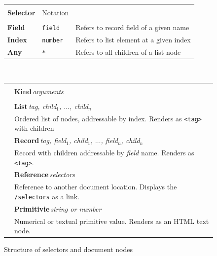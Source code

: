 \documentclass[sigconf]{acmart}
\begin{document}
\begin{figure}
\newcommand{\seltablecol}[3]{
\sffamily\small{\bfseries #2} & {\footnotesize #1} & \footnotesize #3\\
}
\newcommand{\ndtablecol}[4]{
\raisebox{-0.2em}{#1} & \sffamily\small{\bfseries #2}\,\;\textit{\footnotesize #3}\\[-0.2em]
&\sffamily\footnotesize #4\\[0.3em]
}

\begin{tabular}{|llp{18.08em}|}
\hline
\rowcolor{ekgray}
&&\\[-1em]
\rowcolor{ekgray}
\sffamily\small{\bfseries Selector} & {\sffamily\footnotesize Notation} & \\[0.2em]
\hline
&&\\[-1em]
\seltablecol{\Verb|field|}{Field}{Refers to record field of a given name}
\seltablecol{\Verb|number|}{Index}{Refers to list element at a given index}
\seltablecol{\Verb|*|}{Any}{Refers to all children of a list node}
\hline
\end{tabular}

~\\[0.5em]

\begin{tabular}{|cl|}
\hline
\rowcolor{ekgray}
&\\[-1em]
\rowcolor{ekgray}
& \sffamily\small{\bfseries Kind}\;\,\textit{\footnotesize arguments} \\[0.2em]
\hline
&\\[-1em]
\ndtablecol{\faListUl}{List}{tag, child$_1$, $\ldots$, child$_n$}
  {Ordered list of nodes, addressable by index. Renders as \Verb|<tag>| with children}
\ndtablecol{\faFileO}{Record}{tag, field$_1$, child$_1$, $\ldots$, field$_n$, child$_n$}
  {Record with children addressable by \textit{field} name. Renders as \Verb|<tag>|.}
\ndtablecol{\faExternalLink}{Reference}{selectors}
  {Reference to another document location. Displays the \Verb|/selectors| as a link.}
\ndtablecol{\faFont}{Primitivie}{string \textnormal{or} number}
  {Numerical or textual primitive value. Renders as an HTML text node.}
\hline
\end{tabular}
\vspace{-0.5em}
\caption{Structure of selectors and document nodes}
\label{fig:doc}
\vspace{-1em}
\end{figure}

\end{document}

